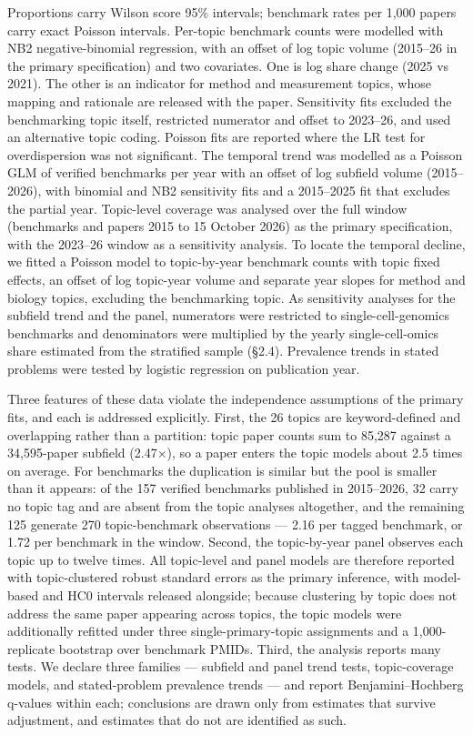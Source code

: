 \documentclass{article}
\begin{document}
Proportions carry Wilson score 95\% intervals; benchmark rates per 1,000
papers carry exact Poisson intervals. Per-topic benchmark counts were
modelled with NB2 negative-binomial regression, with an offset of log
topic volume (2015--26 in the primary specification) and two covariates.
One is log share change (2025 vs 2021). The other is an indicator for
method and measurement topics, whose mapping and rationale are released
with the paper. Sensitivity fits excluded the benchmarking topic itself,
restricted numerator and offset to 2023--26, and used an alternative
topic coding. Poisson fits are reported where the LR test for
overdispersion was not significant. The temporal trend was modelled as a
Poisson GLM of verified benchmarks per year with an offset of log
subfield volume (2015--2026), with binomial and NB2 sensitivity fits and
a 2015--2025 fit that excludes the partial year. Topic-level coverage
was analysed over the full window (benchmarks and papers 2015 to 15
October 2026) as the primary specification, with the 2023--26 window as
a sensitivity analysis. To locate the temporal decline, we fitted a
Poisson model to topic-by-year benchmark counts with topic fixed
effects, an offset of log topic-year volume and separate year slopes for
method and biology topics, excluding the benchmarking topic. As
sensitivity analyses for the subfield trend and the panel, numerators
were restricted to single-cell-genomics benchmarks and denominators were
multiplied by the yearly single-cell-omics share estimated from the
stratified sample (§2.4). Prevalence trends in stated problems were
tested by logistic regression on publication year.

Three features of these data violate the independence assumptions of the
primary fits, and each is addressed explicitly. First, the 26 topics are
keyword-defined and overlapping rather than a partition: topic paper
counts sum to 85,287 against a 34,595-paper subfield (2.47×), so a paper
enters the topic models about 2.5 times on average. For benchmarks the
duplication is similar but the pool is smaller than it appears: of the
157 verified benchmarks published in 2015--2026, 32 carry no topic tag
and are absent from the topic analyses altogether, and the remaining 125
generate 270 topic-benchmark observations --- 2.16 per tagged benchmark,
or 1.72 per benchmark in the window. Second, the topic-by-year panel
observes each topic up to twelve times. All topic-level and panel models
are therefore reported with topic-clustered robust standard errors as
the primary inference, with model-based and HC0 intervals released
alongside; because clustering by topic does not address the same paper
appearing across topics, the topic models were additionally refitted
under three single-primary-topic assignments and a 1,000-replicate
bootstrap over benchmark PMIDs. Third, the analysis reports many tests.
We declare three families --- subfield and panel trend tests,
topic-coverage models, and stated-problem prevalence trends --- and
report Benjamini--Hochberg q-values within each; conclusions are drawn
only from estimates that survive adjustment, and estimates that do not
are identified as such.
\end{document}
